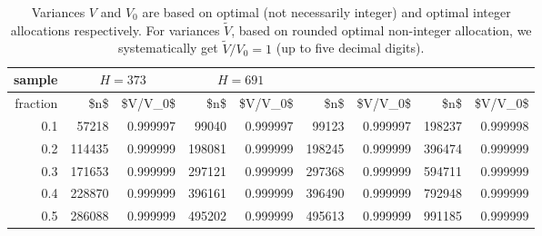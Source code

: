 \begin{table}

\caption{\label{tab:}
\footnotesize Variances $V$ and $V_0$ are based on optimal (not necessarily integer)
and optimal integer allocations respectively.
For variances $\tilde{V}$, based on rounded optimal non-integer allocation,
we systematically get $\tilde{V}/V_0=1$ (up to five decimal digits).}
\centering
\begin{tabular}[t]{r|r|r|r|r|r|r|r|r}
 \hline
 sample  & \multicolumn{2}{|c|}{$H=373$} & \multicolumn{2}{|c|}{$H=691$} \\
 \cline{2-5}
\hline
fraction & \$n\$ & \$V/V\_0\$ & \$n\$ & \$V/V\_0\$ & \$n\$ & \$V/V\_0\$ & \$n\$ & \$V/V\_0\$\\
\hline
0.1 & 57218 & 0.999997 & 99040 & 0.999997 & 99123 & 0.999997 & 198237 & 0.999998\\
\hline
0.2 & 114435 & 0.999999 & 198081 & 0.999999 & 198245 & 0.999999 & 396474 & 0.999999\\
\hline
0.3 & 171653 & 0.999999 & 297121 & 0.999999 & 297368 & 0.999999 & 594711 & 0.999999\\
\hline
0.4 & 228870 & 0.999999 & 396161 & 0.999999 & 396490 & 0.999999 & 792948 & 0.999999\\
\hline
0.5 & 286088 & 0.999999 & 495202 & 0.999999 & 495613 & 0.999999 & 991185 & 0.999999\\
\hline
\end{tabular}
\end{table}